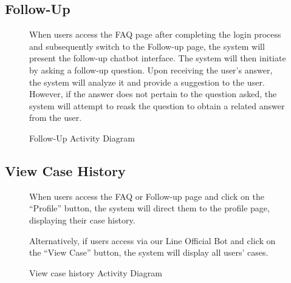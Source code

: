 \documentclass[12pt,oneside,openright,a4paper]{cpe-english-project}
\begin{document}
      \subsection{Follow-Up}
      \begin{figure}[!h]
        \centering
        \caption{Follow-Up Activity Diagram}\label{fig:AD_Follow}
        \begin{flushleft}
          \qquad When users access the FAQ page after completing the login process and subsequently switch to the Follow-up page, the system will present the follow-up chatbot interface. The system will then initiate by asking a follow-up question. Upon receiving the user’s answer, the system will analyze it and provide a suggestion to the user. However, if the answer does not pertain to the question asked, the system will attempt to reask the question to obtain a related answer from the user.   \par
        \end{flushleft}
      \end{figure}
\newpage
      \subsection{View Case History}
      \begin{figure}[!h]
        \centering
        \caption{View case history Activity Diagram}\label{fig:AD_ViewCase}
        \begin{flushleft}
          \qquad When users access the FAQ or Follow-up page and click on the “Profile” button, the system will direct them to the profile page, displaying their case history.  \par
          \qquad Alternatively, if users access via our Line Official Bot and click on the “View Case” button, the system will display all users' cases. \par
        \end{flushleft}
      \end{figure}
\newpage
\end{document}
